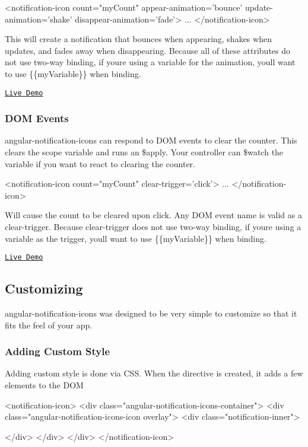 \begin{DoxyCode}
<notification-icon count="myCount" appear-animation='bounce' update-animation='shake'
       disappear-animation='fade'>
    ...
</notification-icon>
\end{DoxyCode}
 This will create a notification that bounces when appearing, shakes when updates, and fades away when disappearing. Because all of these attributes do not use two-\/way binding, if you\textquotesingle{}re using a variable for the animation, you\textquotesingle{}ll want to use \{\{my\+Variable\}\} when binding.

\href{http://jemonjam.com/angular-notification-icons#animations}{\tt Live Demo}

\subsubsection*{D\+OM Events}

angular-\/notification-\/icons can respond to D\+OM events to clear the counter. This clears the scope variable and runs an \$apply. Your controller can \$watch the variable if you want to react to clearing the counter.


\begin{DoxyCode}
<notification-icon count="myCount" clear-trigger='click'>
    ...
</notification-icon>
\end{DoxyCode}
 Will cause the count to be cleared upon click. Any D\+OM event name is valid as a clear-\/trigger. Because clear-\/trigger does not use two-\/way binding, if you\textquotesingle{}re using a variable as the trigger, you\textquotesingle{}ll want to use \{\{my\+Variable\}\} when binding.

\href{http://jemonjam.com/angular-notification-icons#dom-events}{\tt Live Demo}

\subsection*{Customizing}

angular-\/notification-\/icons was designed to be very simple to customize so that it fits the feel of your app.

\subsubsection*{Adding Custom Style}

Adding custom style is done via C\+SS. When the directive is created, it adds a few elements to the D\+OM 
\begin{DoxyCode}
<notification-icon>
    <div class="angular-notification-icons-container">
        <div class="angular-notification-icons-icon overlay">
            <div class="notification-inner">
                
            </div>
        </div>
    </div>
</notification-icon>
\end{DoxyCode}


